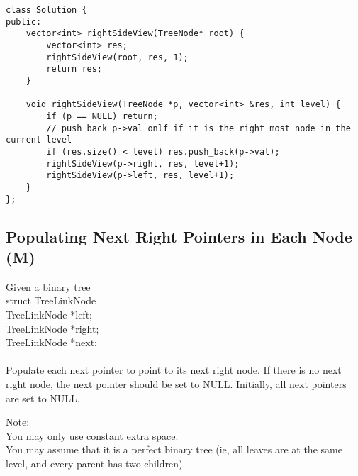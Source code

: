 \begin{lstlisting}
class Solution {
public:
    vector<int> rightSideView(TreeNode* root) {
        vector<int> res;
        rightSideView(root, res, 1);
        return res;
    }
    
    void rightSideView(TreeNode *p, vector<int> &res, int level) {
        if (p == NULL) return;
        // push back p->val onlf if it is the right most node in the current level
        if (res.size() < level) res.push_back(p->val);
        rightSideView(p->right, res, level+1);
        rightSideView(p->left, res, level+1);
    }
};
\end{lstlisting}


\subsection{Populating Next Right Pointers in Each Node (M)}
Given a binary tree\\
    struct TreeLinkNode {\\
      TreeLinkNode *left;\\
      TreeLinkNode *right;\\
      TreeLinkNode *next;\\
    }\\

Populate each next pointer to point to its next right node. If there is no next right node, the next pointer should be set to NULL. Initially, all next pointers are set to NULL.\

Note:\\
    You may only use constant extra space.\\
    You may assume that it is a perfect binary tree (ie, all leaves are at the same level, and every parent has two children).\\
    
